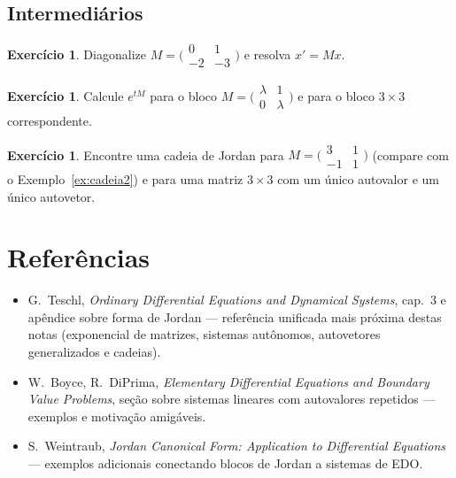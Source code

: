 \documentclass[11pt,a4paper]{amsart}
\theoremstyle{plain}
\theoremstyle{definition}
\newtheorem{exercicio}[teorema]{Exercício}
\theoremstyle{remark}
\begin{document}
\subsection*{Intermedi\'arios}
\begin{exercicio}
Diagonalize $M=\big(\begin{smallmatrix}0&1\\-2&-3\end{smallmatrix}\big)$ e
resolva $x'=Mx$.
\end{exercicio}
\begin{exercicio}
Calcule $e^{tM}$ para o bloco $M=\big(\begin{smallmatrix}\lambda&1\\0&\lambda
\end{smallmatrix}\big)$ e para o bloco $3\times3$ correspondente.
\end{exercicio}
\begin{exercicio}
Encontre uma cadeia de Jordan para $M=\big(\begin{smallmatrix}3&1\\-1&1
\end{smallmatrix}\big)$ (compare com o Exemplo~\ref{ex:cadeia2}) e para uma
matriz $3\times3$ com um \'unico autovalor e um \'unico autovetor.
\end{exercicio}

\section*{Refer\^encias}
\begin{itemize}[leftmargin=1.4em]
  \item G.~Teschl, \emph{Ordinary Differential Equations and Dynamical
        Systems}, cap.~3 e ap\^endice sobre forma de Jordan --- refer\^encia
        unificada mais pr\'oxima destas notas (exponencial de matrizes,
        sistemas aut\^onomos, autovetores generalizados e cadeias).
  \item W.~Boyce, R.~DiPrima, \emph{Elementary Differential Equations and
        Boundary Value Problems}, se\c{c}\~ao sobre sistemas lineares com
        autovalores repetidos --- exemplos e motiva\c{c}\~ao amig\'aveis.
  \item S.~Weintraub, \emph{Jordan Canonical Form: Application to Differential
        Equations} --- exemplos adicionais conectando blocos de Jordan a
        sistemas de EDO.
\end{itemize}
\end{document}
